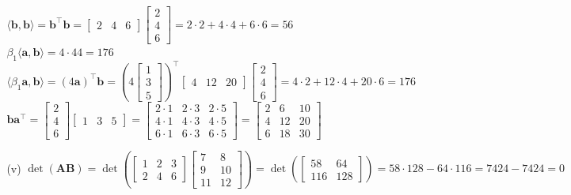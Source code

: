 \documentclass[11pt,letterpaper]{article}
\begin{document}
\begin{enumerate}
\begin{enumerate}
\begin{enumerate}
             $\langle\mathbf{b}, \mathbf{b}\rangle = \mathbf{b}^\top\mathbf{b} = \begin{bmatrix} 2 & 4 & 6 \end{bmatrix} \begin{bmatrix} 2 \\ 4 \\ 6 \end{bmatrix} = 2 \cdot 2 + 4 \cdot 4 + 6 \cdot 6 = 56$\\
             $\beta_1 \langle\mathbf{a}, \mathbf{b}\rangle = 4 \cdot 44 = 176$\\
             $\langle \beta_1 \mathbf{a}, \mathbf{b} \rangle = (4\mathbf{a})^\top \mathbf{b} = \left(4 \begin{bmatrix} 1 \\ 3 \\ 5 \end{bmatrix}\right)^\top \begin{bmatrix} 4 & 12 & 20 \end{bmatrix} \begin{bmatrix} 2 \\ 4 \\ 6 \end{bmatrix} = 4 \cdot 2 + 12 \cdot 4 + 20 \cdot 6 = 176$\\
             $\mathbf{b} \mathbf{a}^\top = \begin{bmatrix} 2 \\ 4 \\ 6 \end{bmatrix} \begin{bmatrix} 1 & 3 & 5 \end{bmatrix} = \begin{bmatrix} 2 \cdot 1 & 2 \cdot 3 & 2 \cdot 5 \\ 4 \cdot 1 & 4 \cdot 3 & 4 \cdot 5 \\ 6 \cdot 1 & 6 \cdot 3 & 6 \cdot 5 \end{bmatrix} = \begin{bmatrix} 2 & 6 & 10 \\ 4 & 12 & 20 \\ 6 & 18 & 30 \end{bmatrix}$
\item [(v)] $\det(\mathbf{AB}) = \det\left(\begin{bmatrix} 1 & 2 & 3 \\ 2 & 4 & 6 \end{bmatrix} \begin{bmatrix} 7 & 8 \\ 9 & 10 \\ 11 & 12 \end{bmatrix}\right) = \det\left(\begin{bmatrix} 58 & 64 \\ 116 & 128 \end{bmatrix}\right) = 58 \cdot 128 - 64 \cdot 116 = 7424 - 7424 = 0$\\

\end{enumerate}
\end{enumerate}
\end{enumerate}
\end{document}
